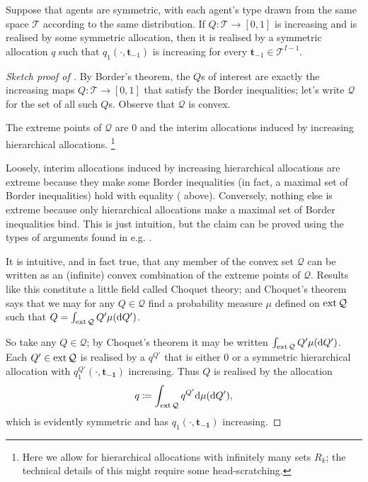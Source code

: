 \begin{corollary}
	\label{corollary:manellivincent}
	Suppose that agents are symmetric,
	with each agent's type drawn from the same space $\mathcal{T}$
	according to the same distribution.
	If $Q : \mathcal{T} \to [0,1]$ is increasing and is realised by some symmetric allocation,
	then it is realised by a symmetric allocation $q$ such that $q_1(\cdot,\boldsymbol{t}_{-1})$ is increasing for every $\boldsymbol{t}_{-1} \in \mathcal{T}^{I-1}$.
\end{corollary}


\begin{proof}[Sketch proof of ]
	By Border's theorem, the $Q$s of interest
	are exactly the increasing maps $Q : \mathcal{T} \to [0,1]$ that satisfy the Border inequalities;
	let's write $\mathcal{Q}$ for the set of all such $Q$s.
	Observe that $\mathcal{Q}$ is convex.

	\begin{claim}
		\label{claim:manellivincent_extr}
		The extreme points of $\mathcal{Q}$
		are $0$ and the interim allocations induced by increasing hierarchical allocations.%
			\footnote{Here we allow for hierarchical allocations with infinitely many sets $R_k$; the technical details of this might require some head-scratching.}
	\end{claim}

	Loosely, interim allocations induced by increasing hierarchical allocations are extreme because they make some Border inequalities (in fact, a maximal set of Border inequalities) hold with equality ( above).
	Conversely, nothing else is extreme because only hierarchical allocations make a maximal set of Border inequalities bind.
	This is just intuition, but the claim can be proved using the types of arguments found in e.g. \textcite{KleinerMoldovanuStrack2021}.

	It is intuitive, and in fact true, that any member of the convex set $\mathcal{Q}$ can be written as an (infinite) convex combination of the extreme points of $\mathcal{Q}$.
	Results like this constitute a little field called Choquet theory;
	and Choquet's theorem says that
	we may for any $Q \in \mathcal{Q}$ find a probability measure $\mu$ defined on $\operatorname*{ext} \mathcal{Q}$ such that $Q = \int_{\operatorname*{ext} \mathcal{Q}} Q' \mu( \mathrm{d} Q' )$.

	So take any $Q \in \mathcal{Q}$;
	by Choquet's theorem it may be written $\int_{\operatorname*{ext} \mathcal{Q}} Q' \mu( \mathrm{d} Q' )$.
	Each $Q' \in \operatorname*{ext} \mathcal{Q}$ is realised by a $q^{Q'}$
	that is either $0$ or a symmetric hierarchical allocation with $q^{Q'}_1(\cdot,\boldsymbol{t_{-1}})$ increasing.
	Thus $Q$ is realised by the allocation
	\begin{equation*}
		q \coloneqq \int_{\operatorname*{ext} \mathcal{Q}} q^{Q'} \mathrm{d} \mu( \mathrm{d} Q' ) ,
	\end{equation*}
	which is evidently symmetric and has $q_1(\cdot,\boldsymbol{t_{-1}})$ increasing.
\end{proof}

